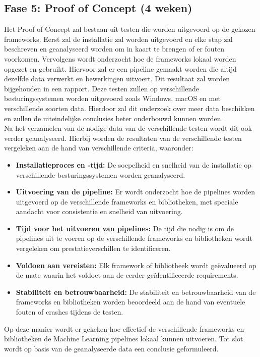 \subsection{Fase 5: Proof of Concept (4 weken)}
Het Proof of Concept zal bestaan uit testen die worden uitgevoerd op de gekozen frameworks. Eerst zal de installatie zal worden uitgevoerd en elke stap zal beschreven en geanalyseerd worden om in kaart te brengen of er fouten voorkomen. Vervolgens wordt onderzocht hoe de frameworks lokaal worden opgezet en gebruikt. Hiervoor zal er een pipeline gemaakt worden die altijd dezelfde data verwerkt en bewerkingen uitvoert. Dit resultaat zal worden bijgehouden in een rapport.
Deze testen zullen op verschillende besturingssystemen worden uitgevoerd zoals Windows, macOS en met verschillende soorten data. Hierdoor zal dit onderzoek over meer data beschikken en zullen de uiteindelijke conclusies beter onderbouwd kunnen worden.\\
Na het verzamelen van de nodige data van de verschillende testen wordt dit ook verder geanalyseerd. Hierbij worden de resultaten van de verschillende testen vergeleken aan de hand van verschillende criteria, waaronder:
\begin{itemize}
  \item \textbf{Installatieproces en -tijd:} De soepelheid en snelheid van de installatie op verschillende besturingssystemen worden geanalyseerd.
  \item \textbf{Uitvoering van de pipeline:} Er wordt onderzocht hoe de pipelines worden uitgevoerd op de verschillende frameworks en bibliotheken, met speciale aandacht voor consistentie en snelheid van uitvoering.
  \item \textbf{Tijd voor het uitvoeren van pipelines:} De tijd die nodig is om de pipelines uit te voeren op de verschillende frameworks en bibliotheken wordt vergeleken om prestatieverschillen te identificeren.
  \item \textbf{Voldoen aan vereisten:} Elk framework of bibliotheek wordt geëvalueerd op de mate waarin het voldoet aan de eerder geïdentificeerde requirements.
  \item \textbf{Stabiliteit en betrouwbaarheid:} De stabiliteit en betrouwbaarheid van de frameworks en bibliotheken worden beoordeeld aan de hand van eventuele fouten of crashes tijdens de testen.
\end{itemize}
Op deze manier wordt er gekeken hoe effectief de verschillende frameworks en bibliotheken de Machine Learning pipelines lokaal kunnen uitvoeren. Tot slot wordt op basis van de geanalyseerde data een conclusie geformuleerd.\\
